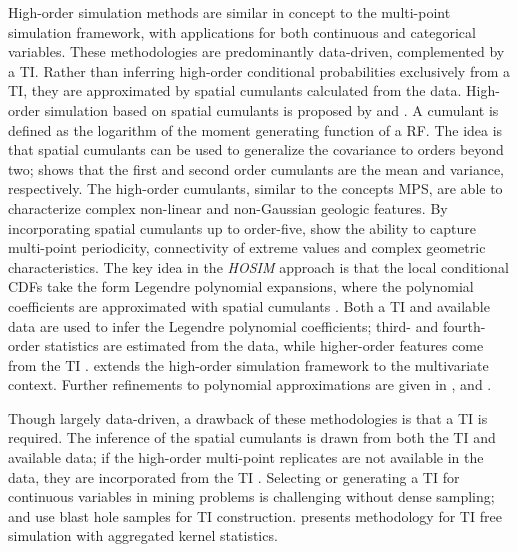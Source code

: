 High-order simulation methods are similar in concept to the multi-point simulation framework, with applications for both continuous and categorical variables. These methodologies are predominantly data-driven, complemented by a \gls{TI}. Rather than inferring high-order conditional probabilities exclusively from a \gls{TI}, they are approximated by spatial cumulants calculated from the data. High-order simulation based on spatial cumulants is proposed by \cite{dimitrakopoulos2009highorder} and \cite{mustapha2010highorder,mustapha2011hosim}. A cumulant is defined as the logarithm of the moment generating function of a \gls{RF}. The idea is that spatial cumulants can be used to generalize the covariance to orders beyond two; \cite{dimitrakopoulos2009highorder} shows that the first and second order cumulants are the mean and variance, respectively. The high-order cumulants, similar to the concepts \gls{MPS}, are able to characterize complex non-linear and non-Gaussian geologic features. By incorporating spatial cumulants up to order-five, \cite{mustapha2010highorder} show the ability to capture multi-point periodicity, connectivity of extreme values and complex geometric characteristics. The key idea in the \textit{HOSIM} approach \citep{mustapha2011hosim} is that the local conditional \glspl{CDF} take the form Legendre polynomial expansions, where the polynomial coefficients are approximated with spatial cumulants \citep{mustapha2010highorder}. Both a \gls{TI} and available data are used to infer the Legendre polynomial coefficients; third- and fourth-order statistics are estimated from the data, while higher-order features come from the \gls{TI} \citep{minniakhmetov2022highorder}. \cite{minniakhmetov2017joint} extends the high-order simulation framework to the multivariate context. Further refinements to polynomial approximations are given in \cite{minniakhmetov2018highorder}, \cite{yao2020highorder} and \cite{yao2021learning}.

Though largely data-driven, a drawback of these methodologies is that a \gls{TI} is required. The inference of the spatial cumulants is drawn from both the \gls{TI} and available data; if the high-order multi-point replicates are not available in the data, they are incorporated from the \gls{TI} \citep{mustapha2010highorder,yao2021training}. Selecting or generating a \gls{TI} for continuous variables in mining problems is challenging without dense sampling; \cite{minniakhmetov2018highorder} and \cite{decarvalho2019highorder} use blast hole samples for \gls{TI} construction. \cite{yao2021training} presents methodology for \gls{TI} free simulation with aggregated kernel statistics.




